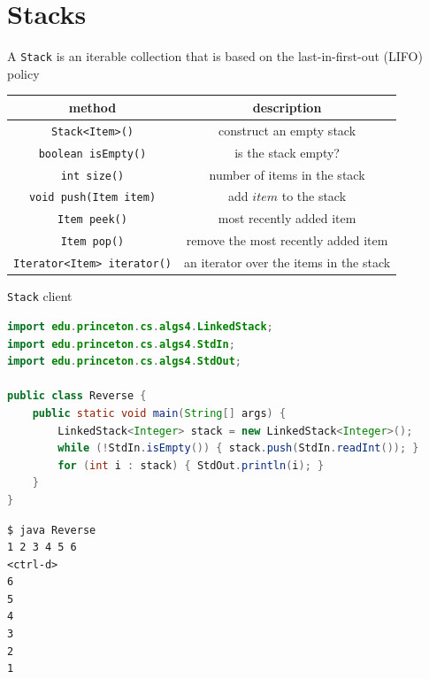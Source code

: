 \documentclass[8pt,a4paper,compress]{beamer}
\begin{document}
\section{Stacks}
\begin{frame}[fragile]
\pause

A \lstinline{Stack} is an iterable collection that is based on the last-in-first-out (LIFO) policy

\begin{center}
\begin{tabular}{cc}
method & description \\ \hline
\lstinline$Stack<Item>()$ & construct an empty stack \\
\lstinline$boolean isEmpty()$ & is the stack empty? \\
\lstinline$int size()$ & number of items in the stack \\
\lstinline$void push(Item item)$ & add $item$ to the stack \\
\lstinline$Item peek()$ & most recently added item \\
\lstinline$Item pop()$ & remove the most recently added item \\
\lstinline$Iterator<Item> iterator()$ & an iterator over the items in the stack
\end{tabular} 
\end{center}

\pause

\lstinline{Stack} client
\begin{lstlisting}[language=Java]
import edu.princeton.cs.algs4.LinkedStack;
import edu.princeton.cs.algs4.StdIn;
import edu.princeton.cs.algs4.StdOut;

public class Reverse {
    public static void main(String[] args) {
        LinkedStack<Integer> stack = new LinkedStack<Integer>();
        while (!StdIn.isEmpty()) { stack.push(StdIn.readInt()); }
        for (int i : stack) { StdOut.println(i); }
    }
}
\end{lstlisting}

\pause

\begin{lstlisting}[language={}]
$ java Reverse 
1 2 3 4 5 6
<ctrl-d>
6
5
4
3
2
1
\end{lstlisting}
\end{frame}
\end{document}
